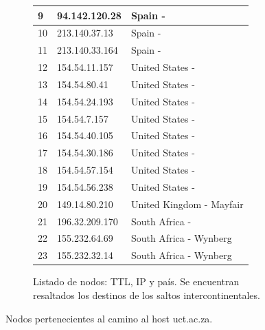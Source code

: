 \begin{figure}[ht]
\begin{subfigure}[b]{.39\textwidth}
\begin{tabular}{ l l l }
      9 & 94.142.120.28 & Spain - \\ \hline
      10 & 213.140.37.13 & Spain - \\ \hline
      11 & 213.140.33.164 & Spain - \\ \hline
      \rowcolor[RGB]{196,214,255}
      12 & 154.54.11.157 & United States - \\ \hline
      13 & 154.54.80.41 & United States - \\ \hline
      14 & 154.54.24.193 & United States - \\ \hline
      15 & 154.54.7.157 & United States - \\ \hline
      16 & 154.54.40.105 & United States - \\ \hline
      \rowcolor[RGB]{196,214,255}
      17 & 154.54.30.186 & United States - \\ \hline
      18 & 154.54.57.154 & United States - \\ \hline
      19 & 154.54.56.238 & United States - \\ \hline
      20 & 149.14.80.210 & United Kingdom - Mayfair\\ \hline
      \rowcolor[RGB]{196,214,255}
      21 & 196.32.209.170 & South Africa - \\ \hline
      22 & 155.232.64.69 & South Africa - Wynberg\\ \hline
      23 & 155.232.32.14 & South Africa - Wynberg\\ \hline
      \hline
    \end{tabular}
    \label{fig:capetown_list}
    \caption{Listado de nodos: TTL, IP y país. Se encuentran resaltados los destinos de los saltos intercontinentales.}
  \end{subfigure}
  \caption{Nodos pertenecientes al camino al host uct.ac.za.}
\end{figure}

